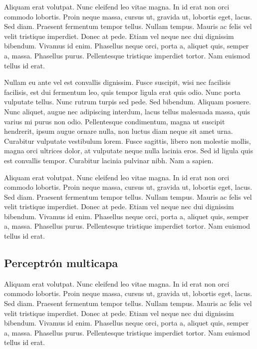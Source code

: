 Aliquam erat volutpat.  Nunc eleifend leo vitae magna.  In id erat non
orci commodo lobortis.  Proin neque massa, cursus ut, gravida ut,
lobortis eget, lacus.  Sed diam.  Praesent fermentum tempor tellus.
Nullam tempus.  Mauris ac felis vel velit tristique imperdiet.  Donec
at pede.  Etiam vel neque nec dui dignissim bibendum.  Vivamus id
enim.  Phasellus neque orci, porta a, aliquet quis, semper a, massa.
Phasellus purus.  Pellentesque tristique imperdiet tortor.  Nam
euismod tellus id erat.

Nullam eu ante vel est convallis dignissim.  Fusce suscipit, wisi nec
facilisis facilisis, est dui fermentum leo, quis tempor ligula erat
quis odio.  Nunc porta vulputate tellus.  Nunc rutrum turpis sed pede.
Sed bibendum.  Aliquam posuere.  Nunc aliquet, augue nec adipiscing
interdum, lacus tellus malesuada massa, quis varius mi purus non odio.
Pellentesque condimentum, magna ut suscipit hendrerit, ipsum augue
ornare nulla, non luctus diam neque sit amet urna.  Curabitur
vulputate vestibulum lorem.  Fusce sagittis, libero non molestie
mollis, magna orci ultrices dolor, at vulputate neque nulla lacinia
eros.  Sed id ligula quis est convallis tempor.  Curabitur lacinia
pulvinar nibh.  Nam a sapien.


Aliquam erat volutpat.  Nunc eleifend leo vitae magna.  In id erat non
orci commodo lobortis.  Proin neque massa, cursus ut, gravida ut,
lobortis eget, lacus.  Sed diam.  Praesent fermentum tempor tellus.
Nullam tempus.  Mauris ac felis vel velit tristique imperdiet.  Donec
at pede.  Etiam vel neque nec dui dignissim bibendum.  Vivamus id
enim.  Phasellus neque orci, porta a, aliquet quis, semper a, massa.
Phasellus purus.  Pellentesque tristique imperdiet tortor.  Nam
euismod tellus id erat.


\subsection{Perceptrón multicapa}

Aliquam erat volutpat.  Nunc eleifend leo vitae magna.  In id erat non
orci commodo lobortis.  Proin neque massa, cursus ut, gravida ut,
lobortis eget, lacus.  Sed diam.  Praesent fermentum tempor tellus.
Nullam tempus.  Mauris ac felis vel velit tristique imperdiet.  Donec
at pede.  Etiam vel neque nec dui dignissim bibendum.  Vivamus id
enim.  Phasellus neque orci, porta a, aliquet quis, semper a, massa.
Phasellus purus.  Pellentesque tristique imperdiet tortor.  Nam
euismod tellus id erat.

